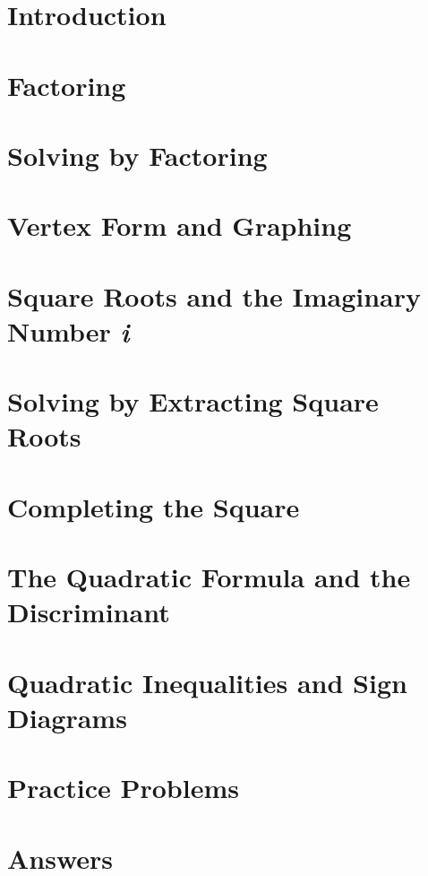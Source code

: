 \section{Introduction}

\newpage

\section{Factoring}

\newpage


\newpage


\newpage


\newpage

\section{Solving by Factoring}

\newpage

\section{Vertex Form and Graphing}

\newpage

\newpage

\section{Square Roots and the Imaginary Number \textit{i}}

\newpage

\section{Solving by Extracting Square Roots}

\newpage

\section{Completing the Square}

\newpage

\section{The Quadratic Formula and the Discriminant}

\newpage

%

\section{Quadratic Inequalities and Sign Diagrams}

\newpage

\section{Practice Problems}

\newpage

\section{Answers}

\newpage
\closegraphsfile